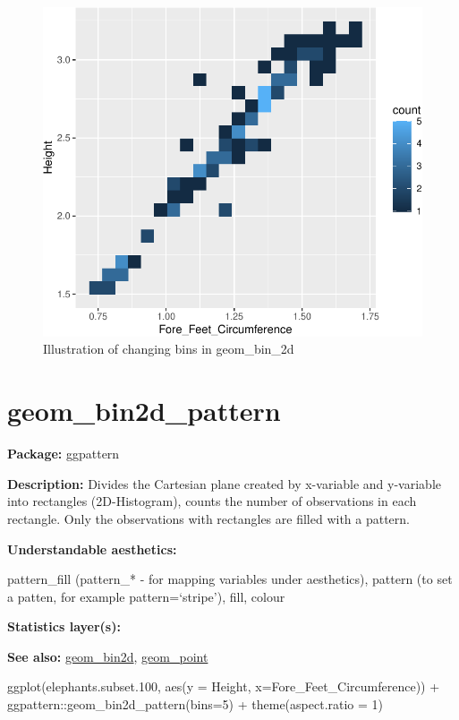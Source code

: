 \documentclass[
]{book}
\newenvironment{Shaded}{\begin{snugshade}}{\end{snugshade}}
\newcommand{\AttributeTok}[1]{\textcolor[rgb]{0.77,0.63,0.00}{#1}}
\newcommand{\DecValTok}[1]{\textcolor[rgb]{0.00,0.00,0.81}{#1}}
\newcommand{\FloatTok}[1]{\textcolor[rgb]{0.00,0.00,0.81}{#1}}
\newcommand{\FunctionTok}[1]{\textcolor[rgb]{0.00,0.00,0.00}{#1}}
\newcommand{\NormalTok}[1]{#1}
\newcommand{\SpecialCharTok}[1]{\textcolor[rgb]{0.00,0.00,0.00}{#1}}
\begin{document}
\begin{figure}
\centering
\includegraphics{Data-Visualisation-geom-Encyclopedia_files/figure-latex/unnamed-chunk-24-1.pdf}
\caption{\label{fig:unnamed-chunk-24}Illustration of changing bins in geom\_bin\_2d}
\end{figure}

\hypertarget{geom_bin2d_pattern}{%
\section{geom\_bin2d\_pattern}\label{geom_bin2d_pattern}}

\textbf{Package: } ggpattern \autocite{R-ggpattern}

\textbf{Description: } Divides the Cartesian plane created by x-variable and y-variable into rectangles (2D-Histogram), counts the number of observations in each rectangle. Only the observations with rectangles are filled with a pattern.

\textbf{Understandable aesthetics: }

pattern\_fill (pattern\_* - for mapping variables under aesthetics), pattern (to set a patten, for example pattern=`stripe'), fill, colour

\textbf{Statistics layer(s): }

\textbf{See also: } \protect\hyperlink{bin2d}{geom\_bin2d}, \protect\hyperlink{point}{geom\_point}

\begin{Shaded}
\begin{Highlighting}[]
\FunctionTok{ggplot}\NormalTok{(elephants.subset}\FloatTok{.100}\NormalTok{, }\FunctionTok{aes}\NormalTok{(}\AttributeTok{y =}\NormalTok{ Height, }\AttributeTok{x=}\NormalTok{Fore\_Feet\_Circumference)) }\SpecialCharTok{+}
\NormalTok{  ggpattern}\SpecialCharTok{::}\FunctionTok{geom\_bin2d\_pattern}\NormalTok{(}\AttributeTok{bins=}\DecValTok{5}\NormalTok{) }\SpecialCharTok{+} 
  \FunctionTok{theme}\NormalTok{(}\AttributeTok{aspect.ratio =} \DecValTok{1}\NormalTok{)}
\end{Highlighting}
\end{Shaded}
\end{document}

